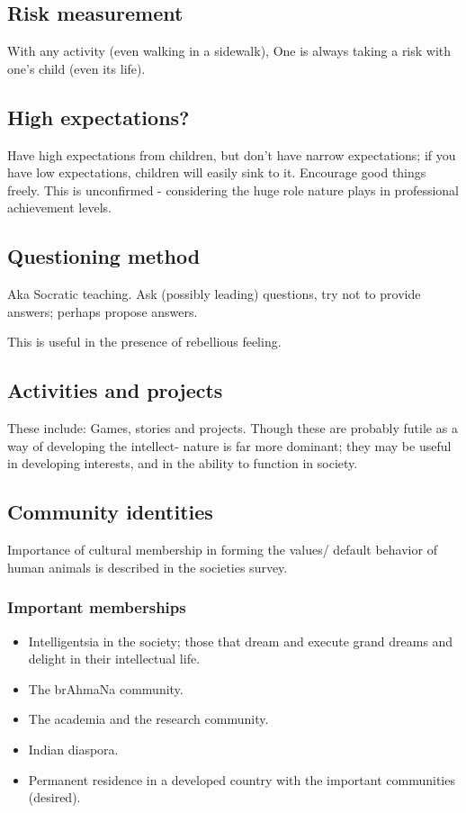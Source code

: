 \documentclass[oneside, article]{memoir}
\begin{document}
\subsection{Risk measurement}
With any activity (even walking in a sidewalk), One is always taking a risk with one's child (even its life).

\subsection{High expectations?}
Have high expectations from children, but don't have narrow expectations; if you have low expectations, children will easily sink to it. Encourage good things freely. This is unconfirmed - considering the huge role nature plays in professional achievement levels.

\subsection{Questioning method}
Aka Socratic teaching. Ask (possibly leading) questions, try not to provide answers; perhaps propose answers.

This is useful in the presence of rebellious feeling.

\subsection{Activities and projects}
These include: Games, stories and projects. Though these are probably futile as a way of developing the intellect- nature is far more dominant; they may be useful in developing interests, and in the ability to function in society.

\subsection{Community identities}
Importance of cultural membership in forming the values/ default behavior of human animals is described in the societies survey.

\subsubsection{Important memberships}
\begin{itemize}
\item Intelligentsia in the society; those that dream and execute grand dreams and delight in their intellectual life.
\item The brAhmaNa community.
\item The academia and the research community.
\item Indian diaspora.
\item Permanent residence in a developed country with the important communities (desired).
\end{itemize}
\end{document}
